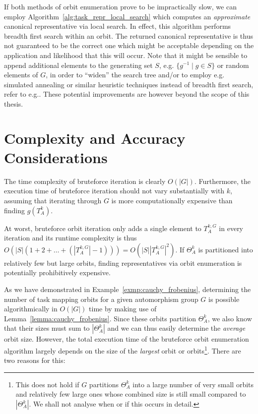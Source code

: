 If both methods of orbit enumeration prove to be impractically slow, we can
employ Algorithm~\ref{alg:task_repr_local_search} which computes an
\textit{approximate} canonical representative via local search. In effect, this
algorithm performs breadth first search within an orbit. The returned canonical
representative is thus not guaranteed to be the correct one which might be
acceptable depending on the application and likelihood that this will occur.
Note that it might be sensible to append additional elements to the generating
set $S$, e.g. $\{g^{-1} \mid g \in S\}$ or random elements of $G$, in order to
``widen'' the search tree and/or to employ e.g. simulated annealing or similar
heuristic techniques instead of breadth first search, refer to
e.g.\cite{Russell}. These potential improvements are however beyond the scope
of this thesis.

\section{Complexity and Accuracy Considerations}
\label{sec:tmor_complexity_and_accuracy_considerations}

The time complexity of bruteforce iteration is clearly $O(|G|)$.  Furthermore,
the execution time of bruteforce iteration should not vary substantially with
$k$, assuming that iterating through $G$ is more computationally expensive than
finding $g(T_{A}^k)$.

At worst, bruteforce orbit iteration only adds a single element to $T_A^{k,G}$
in every iteration and its runtime complexity is thus $O(|S| (1 + 2
+ \dots + (|T_A^{k,G}| - 1))) = O(|S| |T_A^{k,G}|^2)$. If
$\Theta_{A}^k$ is partitioned into relatively few but large orbits, finding
representatives via orbit enumeration is potentially prohibitively expensive.

As we have demonstrated in Example~\ref{exmp:cauchy_frobenius}, determining the
number of task mapping orbits for a given automorphism group $G$ is possible
algorithmically in $O(|G|)$ time by making use of
Lemma~\ref{lemma:cauchy_frobenius}. Since these orbits partition
$\Theta_{A}^k$, we also know that their sizes must sum to $|\Theta_{A}^k|$ and
we can thus easily determine the \textit{average} orbit size. However, the
total execution time of the bruteforce orbit enumeration algorithm largely
depends on the size of the \textit{largest} orbit or orbits\footnote{This does
not hold if $G$ partitions $\Theta_A^k$ into a large number of very small
orbits and relatively few large ones whose combined size is still small
compared to $|\Theta_A^k|$. We shall not analyse when or if this occurs in
detail.}. There are two reasons for this:

